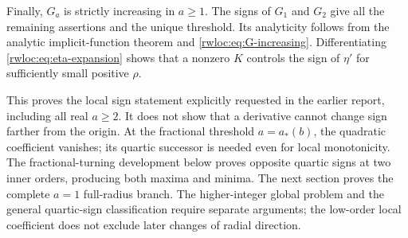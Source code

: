 Finally, $G_a$ is strictly increasing in $a\ge1$. The signs of
$G_1$ and $G_2$ give all the remaining assertions and the unique
threshold. Its analyticity follows from the analytic implicit-function
theorem and \eqref{rwloc:eq:G-increasing}. Differentiating
\eqref{rwloc:eq:eta-expansion} shows that a nonzero $K$ controls the sign
of $\eta'$ for sufficiently small positive $\rho$.

\begin{remark}
This proves the local sign statement explicitly requested in the earlier
report, including all real $a\ge2$. It does not show that a derivative
cannot change sign farther from the origin. At the fractional threshold
$a=a_*(b)$, the quadratic coefficient vanishes; its quartic successor is
needed even for local monotonicity. The fractional-turning development
below proves opposite quartic signs at two inner orders, producing both
maxima and minima.
The next section proves the complete $a=1$ full-radius branch. The
higher-integer global problem and the general quartic-sign classification
require separate arguments; the low-order local coefficient does not
exclude later changes of radial direction.
\end{remark}
